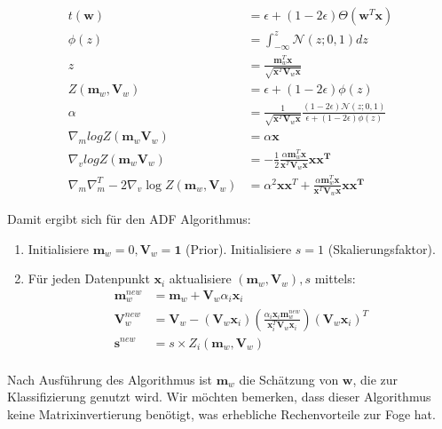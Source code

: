 \documentclass[12pt,a4paper]{scrartcl}
\numberwithin{equation}{section}
\begin{document}
{ \begin{equation}
  \begin{split}
  t(\mathbf{w}) &= \epsilon + (1 - 2 \epsilon) \Theta (\mathbf{w}^T \mathbf{x}) \\
  \phi(z) &= \int_{- \infty}^z \mathcal{N}(z;0,1) dz \\
  z &= \frac{\mathbf{m}_w^T \mathbf{x}}{\sqrt{\mathbf{x}^T \mathbf{V}_w \mathbf{x}}} \\
  Z(\mathbf{m}_w, \mathbf{V}_w) &= \epsilon + (1 - 2 \epsilon) \phi(z) \\
  \alpha &= \frac{1}{ \sqrt{ \mathbf{x}^T \mathbf{V}_w \mathbf{x} } } \frac{ (1 - 2 \epsilon) \mathcal{N}(z;0,1) }{ \epsilon + (1-2 \epsilon) \phi(z) } \\
  \nabla_m log Z(\mathbf{m}_w \mathbf{V}_w) &= \alpha \mathbf{x} \\
  \nabla_v log Z(\mathbf{m}_w \mathbf{V}_w) &= -\frac{1}{2} \frac{ \alpha \mathbf{m}_w^T \mathbf{x} }{\mathbf{x}^T \mathbf{V}_w \mathbf{x}} \mathbf{xx^T} \\
  \nabla_m \nabla_m^T - 2 \nabla_v \log Z(\mathbf{m}_w, \mathbf{V}_w) &= \alpha^2 \mathbf{x} \mathbf{x}^T + \frac{\alpha \mathbf{m}_w^T \mathbf{x}}{ \mathbf{x}^T \mathbf{V}_w \mathbf{x}} \mathbf{x x^T}
  \end{split}
 \end{equation}
  
  Damit ergibt sich für den ADF Algorithmus: 
  
  \begin{enumerate}
   \item Initialisiere $\mathbf{m}_w = 0, \mathbf{V}_w = \mathbf{1}$ (Prior). Initialisiere $s = 1$ (Skalierungsfaktor).
   \item Für jeden Datenpunkt $\mathbf{x}_i$ aktualisiere $(\mathbf{m}_w, \mathbf{V}_w), s$ mittels:
   \begin{equation}
    \begin{split}
      \mathbf{m}_w^{new} &= \mathbf{m}_w + \mathbf{V}_w \alpha_i \mathbf{x}_i \\
      \mathbf{V}_w^{new} &= \mathbf{V}_w - (\mathbf{V}_w \mathbf{x}_i) (\frac{ \alpha_i \mathbf{x}_i \mathbf{m}_w^{new}}{ \mathbf{x}_i^T \mathbf{V}_w \mathbf{x}_i }) (\mathbf{V}_w \mathbf{x}_i)^T \\
      \mathbf{s}^{new} &= s \times Z_i(\mathbf{m}_w, \mathbf{V}_w) \\
    \end{split}
   \end{equation}
  \end{enumerate}
   Nach Ausführung des Algorithmus ist $\mathbf{m}_w$ die Schätzung von $\mathbf{w}$, die zur Klassifizierung genutzt wird. Wir 
   möchten bemerken, dass dieser Algorithmus keine Matrixinvertierung benötigt, was erhebliche Rechenvorteile zur Foge hat.

}
\end{document}
